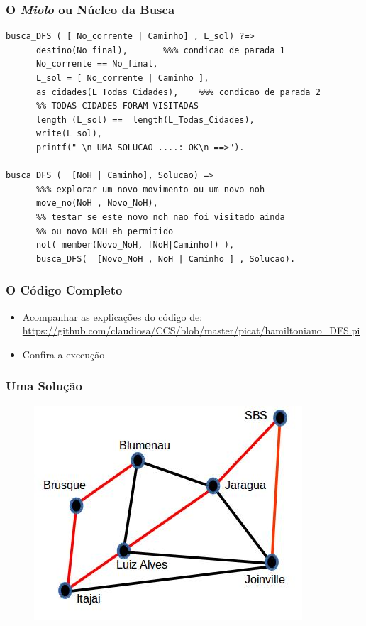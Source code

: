 \begin{frame}[fragile]
 \frametitle{O \textit{Miolo} ou Núcleo  da Busca}

\begin{footnotesize}
\begin{verbatim}
busca_DFS ( [ No_corrente | Caminho] , L_sol) ?=>
      destino(No_final),       %%% condicao de parada 1
      No_corrente == No_final,
      L_sol = [ No_corrente | Caminho ],
      as_cidades(L_Todas_Cidades),    %%% condicao de parada 2
      %% TODAS CIDADES FORAM VISITADAS
      length (L_sol) ==  length(L_Todas_Cidades),
      write(L_sol),
      printf(" \n UMA SOLUCAO ....: OK\n ==>"). 

busca_DFS (  [NoH | Caminho], Solucao) =>
      %%% explorar um novo movimento ou um novo noh
      move_no(NoH , Novo_NoH), 
      %% testar se este novo noh nao foi visitado ainda
      %% ou novo_NOH eh permitido
      not( member(Novo_NoH, [NoH|Caminho]) ),
      busca_DFS(  [Novo_NoH , NoH | Caminho ] , Solucao).
\end{verbatim}
\end{footnotesize}

\end{frame}


\begin{frame}[fragile]
 \frametitle{O Código Completo}

\begin{itemize}
  \item Acompanhar as explicações do código de:\\
\url{https://github.com/claudiosa/CCS/blob/master/picat/hamiltoniano_DFS.pi}

  \item Confira a execuç\~ao
\end{itemize}
\end{frame}



\begin{frame}[fragile]
\frametitle{Uma Soluç\~ao}

\begin{figure}[!htb]
\centering
\includegraphics[width=.8\textwidth, height=0.567\textheight]{figures/mapa02SC.jpg}
\end{figure}

\end{frame}




